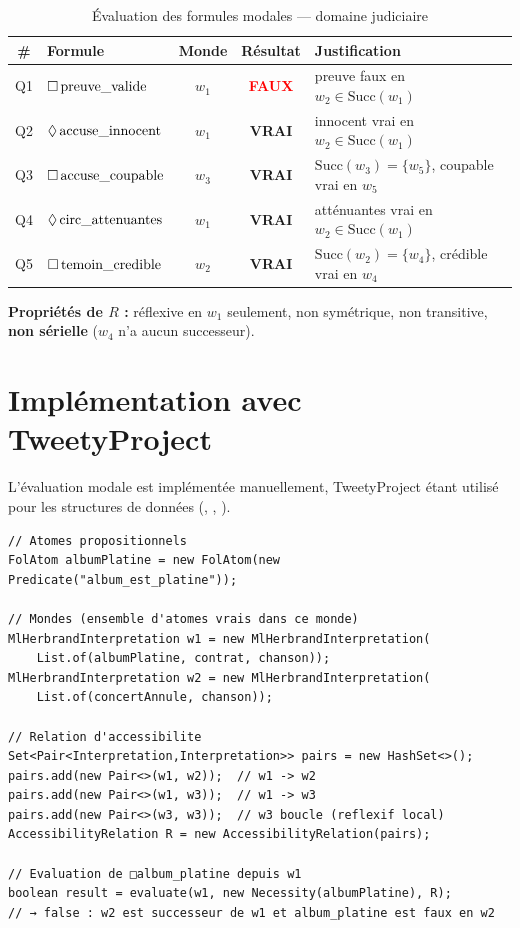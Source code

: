 \begin{table}[H]
\centering
\caption{Évaluation des formules modales — domaine judiciaire}
\begin{tabularx}{\linewidth}{clccX}
\toprule
\textbf{\#} & \textbf{Formule} & \textbf{Monde} & \textbf{Résultat} & \textbf{Justification} \\
\midrule
Q1 & $\Box\,\text{preuve\_valide}$ & $w_1$ & \textcolor{red}{\textbf{FAUX}}
   & preuve faux en $w_2 \in \mathrm{Succ}(w_1)$ \\
Q2 & $\Diamond\,\text{accuse\_innocent}$ & $w_1$ & \textcolor{codegreen}{\textbf{VRAI}}
   & innocent vrai en $w_2 \in \mathrm{Succ}(w_1)$ \\
Q3 & $\Box\,\text{accuse\_coupable}$ & $w_3$ & \textcolor{codegreen}{\textbf{VRAI}}
   & $\mathrm{Succ}(w_3) = \{w_5\}$, coupable vrai en $w_5$ \\
Q4 & $\Diamond\,\text{circ\_attenuantes}$ & $w_1$ & \textcolor{codegreen}{\textbf{VRAI}}
   & atténuantes vrai en $w_2 \in \mathrm{Succ}(w_1)$ \\
Q5 & $\Box\,\text{temoin\_credible}$ & $w_2$ & \textcolor{codegreen}{\textbf{VRAI}}
   & $\mathrm{Succ}(w_2) = \{w_4\}$, crédible vrai en $w_4$ \\
\bottomrule
\end{tabularx}
\end{table}

\noindent\textbf{Propriétés de $R$ :} réflexive en $w_1$ seulement,
non symétrique, non transitive, \textbf{non sérielle} ($w_4$ n'a aucun successeur).

\section{Implémentation avec TweetyProject}

L'évaluation modale est implémentée manuellement, TweetyProject étant utilisé
pour les structures de données (, ,
).

\begin{lstlisting}[caption={Construction du modèle de Kripke en Java}]
// Atomes propositionnels
FolAtom albumPlatine = new FolAtom(new Predicate("album_est_platine"));

// Mondes (ensemble d'atomes vrais dans ce monde)
MlHerbrandInterpretation w1 = new MlHerbrandInterpretation(
    List.of(albumPlatine, contrat, chanson));
MlHerbrandInterpretation w2 = new MlHerbrandInterpretation(
    List.of(concertAnnule, chanson));

// Relation d'accessibilite
Set<Pair<Interpretation,Interpretation>> pairs = new HashSet<>();
pairs.add(new Pair<>(w1, w2));  // w1 -> w2
pairs.add(new Pair<>(w1, w3));  // w1 -> w3
pairs.add(new Pair<>(w3, w3));  // w3 boucle (reflexif local)
AccessibilityRelation R = new AccessibilityRelation(pairs);

// Evaluation de □album_platine depuis w1
boolean result = evaluate(w1, new Necessity(albumPlatine), R);
// → false : w2 est successeur de w1 et album_platine est faux en w2
\end{lstlisting}

